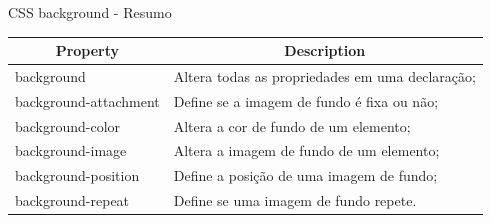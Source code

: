\documentclass{beamer}
\begin{document}
\begin{frame}{CSS background - Resumo}
\small
\begin{table}[]
\centering
\begin{tabular}{|l|l|}
\hline
\multicolumn{1}{|c|}{\textbf{Property}} & \multicolumn{1}{c|}{\textbf{Description}} \\ \hline
background & Altera todas as propriedades em uma declaração; \\ \hline
background-attachment & Define se a imagem de fundo é fixa ou não; \\ \hline
background-color & Altera a cor de fundo de um elemento; \\ \hline
background-image & Altera a imagem de fundo de um elemento; \\ \hline
background-position & Define a posição de uma imagem de fundo; \\ \hline
background-repeat & Define se uma imagem de fundo repete. \\ \hline
\end{tabular}
\end{table}
\end{frame}
\end{document}
